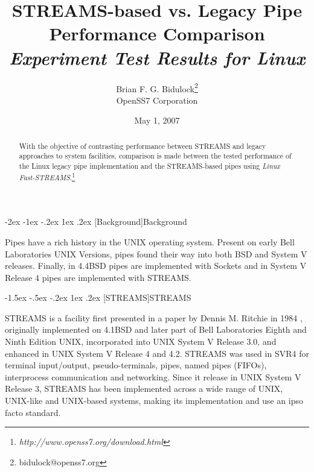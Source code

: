 \documentclass[letterpaper,final,notitlepage,twocolumn,10pt,twoside]{article}
\makeatletter
\renewcommand\section{\@startsection {section}{1}{\z@}%
                                   {-2ex \@plus -1ex \@minus -.2ex}%
                                   {1ex \@plus .2ex}%
                                   {\normalfont\large\bfseries}}
\renewcommand\subsection{\@startsection{subsection}{2}{\z@}%
                                     {-1.5ex \@plus -.5ex \@minus -.2ex}%
                                     {1ex \@plus .2ex}%
                                     {\normalfont\normalsize\bfseries}}
\makeatother
\begin{document}

\title{STREAMS-based vs. Legacy Pipe Performance Comparison\\[0.5ex]
	{\large \textsl{Experiment Test Results for Linux}}}
\author{Brian F. G. Bidulock\thanks{bidulock@openss7.org}\\
	OpenSS7 Corporation}
\date{May 1, 2007}
\maketitle

\begin{abstract}
With the objective of contrasting performance between STREAMS and legacy
approaches to system facilities, comparison is made between the tested
performance of the Linux legacy pipe implementation and the STREAMS-based
pipes using \textsl{Linux
Fast-STREAMS}.\footnote{\textit{http://www.openss7.org/download.html}}
\end{abstract}


\section[Background]{Background}

Pipes have a rich history in the UNIX operating system.  Present on early Bell
Laboratories UNIX Versions, pipes found their way into both BSD and System V
releases.  Finally, in 4.4BSD pipes are implemented with Sockets and in System
V Release 4 pipes are implemented with STREAMS.

\subsection[STREAMS]{STREAMS}

STREAMS is a facility first presented in a paper by Dennis M. Ritchie in 1984
\cite[]{Ritchie84}, originally implemented on 4.1BSD and later part of Bell
Laboratories Eighth and Ninth Edition UNIX, incorporated into UNIX System V
Release 3.0, and enhanced in UNIX System V Release 4 and 4.2.  STREAMS was
used in SVR4 for terminal input/output, pseudo-terminals, pipes, named pipes
(FIFOs), interprocess communication and networking.  Since it release in UNIX
System V Release 3, STREAMS has been implemented across a wide range of UNIX,
UNIX-like and UNIX-based systems, making its implementation and use an ipso
facto standard.
\end{document}
